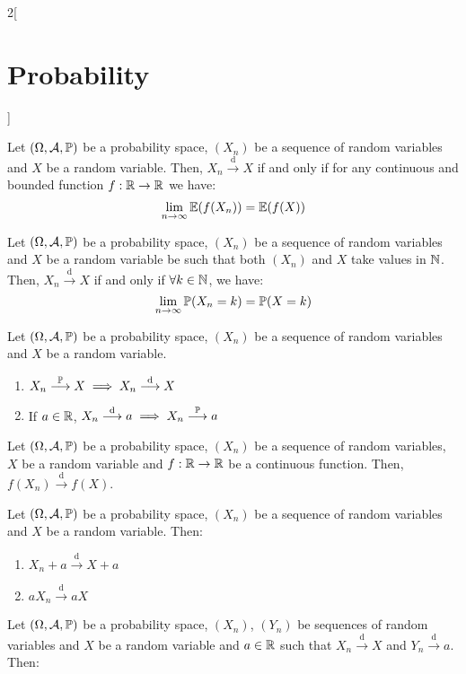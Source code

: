 \documentclass[../../../main.tex]{subfiles}
\begin{document}
\begin{multicols}{2}[\section{Probability}]
\begin{theorem}
  \end{theorem}
  \begin{theorem}
    Let $(\Omega,\mathcal{A},\mathbb{P})$ be a probability space, $(X_n)$ be a sequence of random variables and $X$ be a random variable. Then, $X_n\overset{\text{d}}{\longrightarrow} X$ if and only if for any continuous and bounded function $f:\mathbb{R}\rightarrow\mathbb{R}$ we have: $$\lim_{n\to\infty}\mathbb{E}(f(X_n))=\mathbb{E}(f(X))$$
  \end{theorem}
  \begin{lemma}
    Let $(\Omega,\mathcal{A},\mathbb{P})$ be a probability space, $(X_n)$ be a sequence of random variables and $X$ be a random variable be such that both $(X_n)$ and $X$ take values in $\mathbb{N}$. Then, $X_n\overset{\text{d}}{\longrightarrow} X$ if and only if $\forall k\in\mathbb{N}$, we have: $$\lim_{n\to\infty} \mathbb{P}(X_n=k)=\mathbb{P}(X=k)$$
  \end{lemma}
  \begin{prop}
    Let $(\Omega,\mathcal{A},\mathbb{P})$ be a probability space, $(X_n)$ be a sequence of random variables and $X$ be a random variable.
    \begin{enumerate}
      \item $X_n\overset{\mathbb{P}}{\longrightarrow} X\implies X_n\overset{\text{d}}{\longrightarrow} X$
      \item If $a\in\mathbb{R}$, $X_n\overset{\text{d}}{\longrightarrow} a\implies X_n\overset{\mathbb{P}}{\longrightarrow} a$
    \end{enumerate}
  \end{prop}
  \begin{prop}
    Let $(\Omega,\mathcal{A},\mathbb{P})$ be a probability space, $(X_n)$ be a sequence of random variables, $X$ be a random variable and $f:\mathbb{R}\rightarrow\mathbb{R}$ be a continuous function. Then, $f(X_n)\overset{\text{d}}{\longrightarrow}f(X)$.
  \end{prop}
  \begin{corollary}
    Let $(\Omega,\mathcal{A},\mathbb{P})$ be a probability space, $(X_n)$ be a sequence of random variables and $X$ be a random variable. Then:
    \begin{enumerate}
      \item $X_n+a\overset{\text{d}}{\longrightarrow}X+a$
      \item $aX_n\overset{\text{d}}{\longrightarrow}aX$
    \end{enumerate}
  \end{corollary}
  \begin{theorem}
    Let $(\Omega,\mathcal{A},\mathbb{P})$ be a probability space, $(X_n)$, $(Y_n)$ be sequences of random variables and $X$ be a random variable and $a\in\mathbb{R}$ such that $X_n\overset{\text{d}}{\longrightarrow} X$ and $Y_n\overset{\text{d}}{\longrightarrow} a$. Then:

\end{theorem}
\end{multicols}
\end{document}
